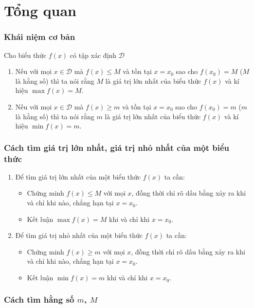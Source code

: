
\section*{Tổng quan}

\tocless \subsubsection{Khái niệm cơ bản}
\begin{dn} Cho biểu thức $f(x)$ có tập xác định $\mathscr{D}$
	\begin{enumerate}
		\item Nếu với mọi $x\in\mathscr{D}$ mà $f(x)\leq M$ và tồn tại $x=x_0$ sao cho $f(x_0)=M$ ($M$ là hằng số) thì ta nói rằng $M$ là giá trị lớn nhất của biểu thức $f(x)$ và kí hiệu $\max f(x)=M$.
		\item Nếu với mọi $x\in\mathscr{D}$ mà $f(x)\geq m$ và tồn tại $x=x_0$ sao cho $f(x_0)=m$ ($m$ là hằng số) thì ta nói rằng $m$ là giá trị lớn nhất của biểu thức $f(x)$ và kí hiệu $\min f(x)=m$.
	\end{enumerate}	
\end{dn}
\tocless \subsubsection{Cách tìm giá trị lớn nhất, giá trị nhỏ nhất của một biểu thức}
\begin{enumerate}
	\item Để tìm giá trị lớn nhất của một biểu thức $f(x)$ ta cần:
	\begin{itemize}
		\item Chứng minh $f(x)\leq M$ với mọi $x$, đồng thời chỉ rõ dấu bằng xảy ra khi và chỉ khi nào, chẳng hạn tại $x=x_0$.
		\item Kết luận $\max f(x)=M$ khi và chỉ khi $x=x_0$.
	\end{itemize}
	\item Để tìm giá trị nhỏ nhất của một biểu thức $f(x)$ ta cần:
	\begin{itemize}
		\item Chứng minh $f(x)\geq m$ với mọi $x$, đồng thời chỉ rõ dấu bằng xảy ra khi và chỉ khi nào, chẳng hạn tại $x=x_0$.
		\item Kết luận $\min f(x)=m$ khi và chỉ khi $x=x_0$.
	\end{itemize}	
\end{enumerate}	
\tocless \subsubsection{Cách tìm hằng số $m$, $M$}
